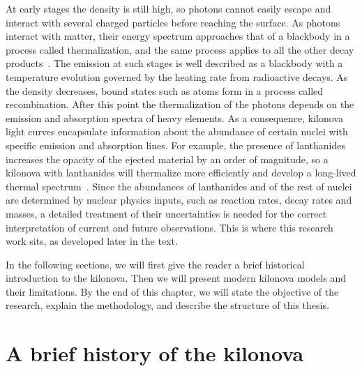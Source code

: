 At early stages the density is still high, so photons cannot easily escape and interact with several charged particles before reaching the surface.
As photons interact with matter, their energy spectrum approaches that of a blackbody in a process called thermalization, and the same process applies to all the other decay products~\cite{barnes_radioactivity_2016}.
The emission at such stages is well described as a blackbody with a temperature evolution governed by the heating rate from radioactive decays. 
As the density decreases, bound states such as atoms form in a process called recombination.
After this point the thermalization of the photons depends on the emission and absorption spectra of heavy elements.
As a consequence, kilonova light curves encapsulate information about the abundance of certain nuclei with specific emission and absorption lines. 
For example, the presence of lanthanides increases the opacity of the ejected material by an order of magnitude, so a kilonova with lanthanides will thermalize more efficiently and develop a long-lived thermal spectrum~\cite{yang_lanthanide-rich_2024}.
Since the abundances of lanthanides and of the rest of nuclei are determined by nuclear physics inputs, such as reaction rates, decay rates and masses, a detailed treatment of their uncertainties is needed for the correct interpretation of current and future observations. 
This is where this research work sits, as developed later in the text.

In the following sections, we will first give the reader a brief historical introduction to the kilonova.
Then we will present modern kilonova models and their limitations.
By the end of this chapter, we will state the objective of the research, explain the methodology, and describe the structure of this thesis. 



\section{A brief history of the kilonova}\label{sec:briefkilo}

